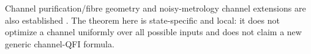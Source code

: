 \documentclass[aps,pra,preprint,nofootinbib]{revtex4-2}
\begin{document}
Channel purification/fibre geometry and noisy-metrology channel extensions are also established \cite{FujiwaraImai2008,EscherEtAl2011,DemkowiczKolodynskiGuta2012}. The theorem here is state-specific and local: it does not optimize a channel uniformly over all possible inputs and does not claim a new generic channel-QFI formula.


\end{document}

